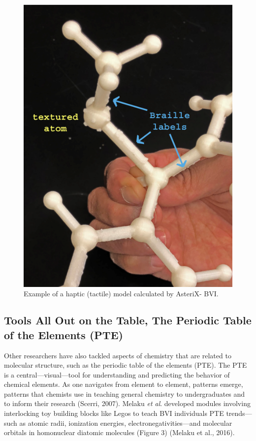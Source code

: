 \documentclass[11.5pt]{sig-alternate} %
\begin{document}
\begin{large}
\begin{figure}[h]
    \centering
    \includegraphics[width=1\linewidth]{fig2.png}
    \caption{Example of a haptic (tactile) model calculated by AsteriX- BVI.}
\end{figure}

\newpage
\subsection*{Tools All Out on the Table, The Periodic Table of the Elements (PTE)}

Other researchers have also tackled aspects of chemistry that are related to molecular structure, such as the periodic table of the elements (PTE). The PTE is a central—visual—tool for understanding and predicting the behavior of chemical elements. As one navigates from element to element, patterns emerge, patterns that chemists use in teaching general chemistry to undergraduates and to inform their research (Scerri, 2007). Melaku \textit{et al}. developed modules involving interlocking toy building blocks like Legos to teach BVI individuals PTE trends—such as atomic radii, ionization energies, electronegativities—and molecular orbitals in homonuclear diatomic molecules (Figure 3) (Melaku et al., 2016).


\end{large}
\end{document}
